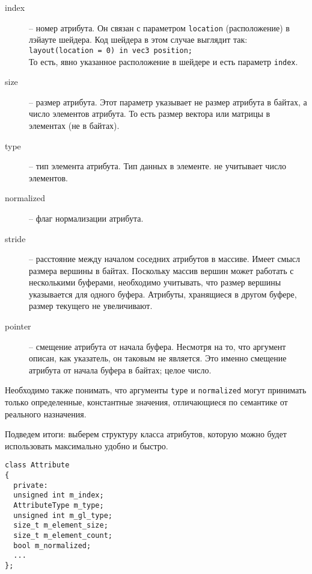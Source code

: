 \documentclass[a4paper, 12pt]{article}
\begin{document}
\begin{description}
      \item[index] -- номер атрибута. Он связан с параметром \texttt{location}
            (расположение) в лэйауте шейдера. Код шейдера в этом случае
            выглядит так: \\
            \texttt{layout(location = 0) in vec3 position;} \\
            То есть, явно указанное расположение в шейдере и есть параметр
            \texttt{index}.
      \item[size] -- размер атрибута. Этот параметр указывает не размер
            атрибута в байтах, а число элементов атрибута. То есть размер
            вектора или матрицы в элементах (не в байтах).
      \item[type] -- тип элемента атрибута. Тип данных в элементе. не учитывает
            число элементов.
      \item[normalized] -- флаг нормализации атрибута.
      \item[stride] -- расстояние между началом соседних атрибутов в массиве.
            Имеет смысл размера вершины в байтах. Поскольку массив вершин может
            работать с несколькими буферами, необходимо учитывать, что размер
            вершины указывается для одного буфера. Атрибуты, хранящиеся в
            другом буфере, размер текущего не увеличивают.
      \item[pointer] -- смещение атрибута от начала буфера. Несмотря на то, что
            аргумент описан, как указатель, он таковым не является. Это именно
            смещение атрибута от начала буфера в байтах; целое число.
\end{description}

Необходимо также понимать, что аргументы \texttt{type} и \texttt{normalized}
могут принимать только определенные, константные значения, отличающиеся по
семантике от реального назначения.

Подведем итоги: выберем структуру класса атрибутов, которую можно будет
использовать максимально удобно и быстро.

\begin{verbatim}
class Attribute
{
  private:
  unsigned int m_index;
  AttributeType m_type;
  unsigned int m_gl_type;
  size_t m_element_size;
  size_t m_element_count;
  bool m_normalized;
  ...
};
\end{verbatim}
\end{document}

